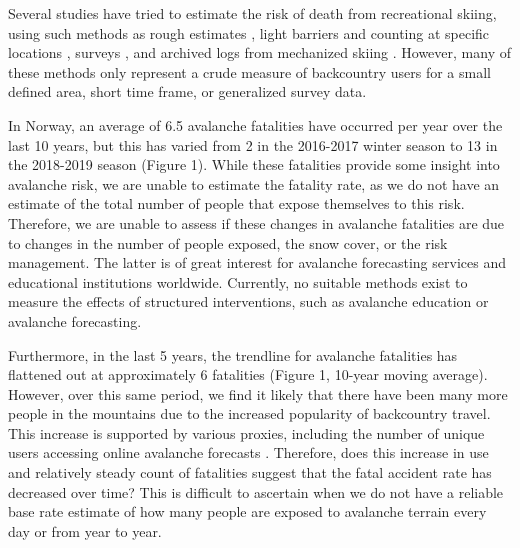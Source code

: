 \documentclass[authordate,empirical]{jote-new-article}
\begin{document}
Several studies have tried to estimate the risk of death from recreational skiing, using such methods as rough estimates \parencites{Valla1984}, light barriers and counting at specific locations \parencites{Zweifel2006}, surveys \parencites{Sole2008}{Winkler2016}, and archived logs from mechanized skiing \parencites{Walcher2019}. However, many of these methods only represent a crude measure of backcountry users for a small defined area, short time frame, or generalized survey data.







In Norway, an average of 6.5 avalanche fatalities have occurred per year over the last 10 years, but this has varied from 2 in the 2016-2017 winter season to 13 in the 2018-2019 season (Figure 1). While these fatalities provide some insight into avalanche risk, we are unable to estimate the fatality rate, as we do not have an estimate of the total number of people that expose themselves to this risk. Therefore, we are unable to assess if these changes in avalanche fatalities are due to changes in the number of people exposed, the snow cover, or the risk management. The latter is of great interest for avalanche forecasting services and educational institutions worldwide. Currently, no suitable methods exist to measure the effects of structured interventions, such as avalanche education or avalanche forecasting.







Furthermore, in the last 5 years, the trendline for avalanche fatalities has flattened out at approximately 6 fatalities (Figure 1, 10-year moving average). However, over this same period, we find it likely that there have been many more people in the mountains due to the increased popularity of backcountry travel. This increase is supported by various proxies, including the number of unique users accessing online avalanche forecasts \parencites{Engeset2018}. Therefore, does this increase in use and relatively steady count of fatalities suggest that the fatal accident rate has decreased over time? This is difficult to ascertain when we do not have a reliable base rate estimate of how many people are exposed to avalanche terrain every day or from year to year.
\end{document}
